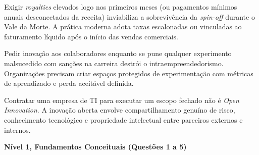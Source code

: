 \begin{boxErro}
  Exigir \textit{royalties} elevados logo nos primeiros meses (ou pagamentos mínimos anuais desconectados da receita) inviabiliza a sobrevivência da \textit{spin-off} durante o Vale da Morte. A prática moderna adota taxas escalonadas ou vinculadas ao faturamento líquido após o início das vendas comerciais.
\end{boxErro}

\begin{boxErro}
  Pedir inovação aos colaboradores enquanto se pune qualquer experimento malsucedido com sanções na carreira destrói o intraempreendedorismo. Organizações precisam criar espaços protegidos de experimentação com métricas de aprendizado e perda aceitável definida.
\end{boxErro}

\begin{boxErro}
  Contratar uma empresa de TI para executar um escopo fechado não é \textit{Open Innovation}. A inovação aberta envolve compartilhamento genuíno de risco, conhecimento tecnológico e propriedade intelectual entre parceiros externos e internos.
\end{boxErro}


\textbf{Nível 1, Fundamentos Conceituais (Questões 1 a 5)}

